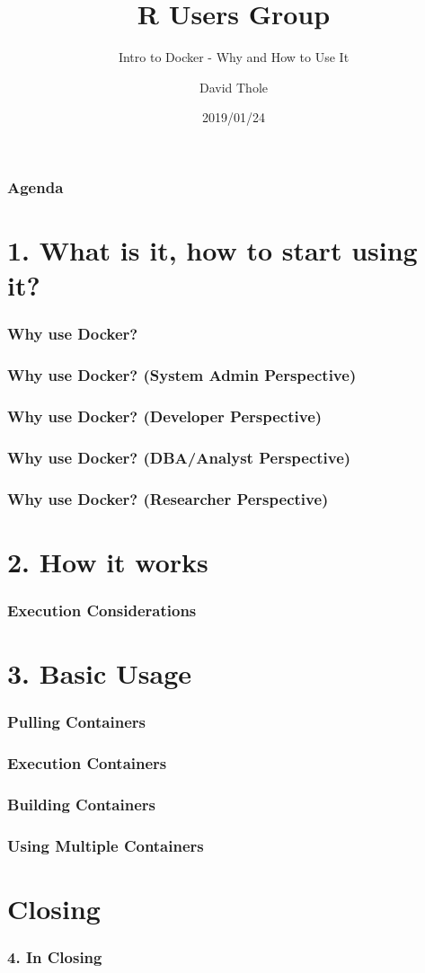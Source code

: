 \documentclass{beamer}
\title{R Users Group}
\subtitle{Intro to Docker - Why and How to Use It}
\author{David Thole}
\institute{University of Iowa, College of Pharmacy}
\date{2019/01/24}
\begin{document}
\frame{\titlepage}

\begin{frame}
    \frametitle{Agenda}
    \tableofcontents
\end{frame}

\section{1. What is it, how to start using it?}
\begin{frame}
    \frametitle{Why use Docker?}
\end{frame}

\begin{frame}
    \frametitle{Why use Docker? (System Admin Perspective)}
\end{frame}

\begin{frame}
    \frametitle{Why use Docker? (Developer Perspective)}
\end{frame}

\begin{frame}
    \frametitle{Why use Docker? (DBA/Analyst Perspective)}
\end{frame}

\begin{frame}
    \frametitle{Why use Docker? (Researcher Perspective)}
\end{frame}

\section{2. How it works}
\begin{frame}
    \frametitle{Execution Considerations}
\end{frame}

\section{3. Basic Usage}
\begin{frame}
    \frametitle{Pulling Containers}
\end{frame}

\begin{frame}
    \frametitle{Execution Containers}
\end{frame}

\begin{frame}
    \frametitle{Building Containers}
\end{frame}

\begin{frame}
    \frametitle{Using Multiple Containers}
\end{frame}

\section{Closing}
\begin{frame}
    \frametitle{4. In Closing}
\end{frame}
\end{document}

